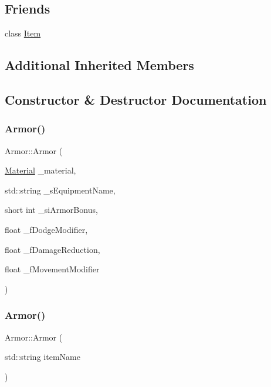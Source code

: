 \subsection*{Friends}
\begin{DoxyCompactItemize}
\item 
class \mbox{\hyperlink{class_armor_aad85754f188b769ff61150eaf36106c4}{Item}}
\end{DoxyCompactItemize}
\subsection*{Additional Inherited Members}


\subsection{Constructor \& Destructor Documentation}
\mbox{\label{class_armor_a4a33d37eb11165792cce7035dfb2ff93}} 
\subsubsection{\texorpdfstring{Armor()}{Armor()}\hspace{0.1cm}{\footnotesize\ttfamily [1/5]}}
{\footnotesize\ttfamily Armor\+::\+Armor (\begin{DoxyParamCaption}\item[{\mbox{\hyperlink{class_material}{Material}}}]{\+\_\+material,  }\item[{std\+::string}]{\+\_\+s\+Equipment\+Name,  }\item[{short int}]{\+\_\+si\+Armor\+Bonus,  }\item[{float}]{\+\_\+f\+Dodge\+Modifier,  }\item[{float}]{\+\_\+f\+Damage\+Reduction,  }\item[{float}]{\+\_\+f\+Movement\+Modifier }\end{DoxyParamCaption})}

\mbox{\label{class_armor_a6e58e27c6b7550a8baf7fb1b2167d6cc}} 
\subsubsection{\texorpdfstring{Armor()}{Armor()}\hspace{0.1cm}{\footnotesize\ttfamily [2/5]}}
{\footnotesize\ttfamily Armor\+::\+Armor (\begin{DoxyParamCaption}\item[{std\+::string}]{item\+Name }\end{DoxyParamCaption})}

